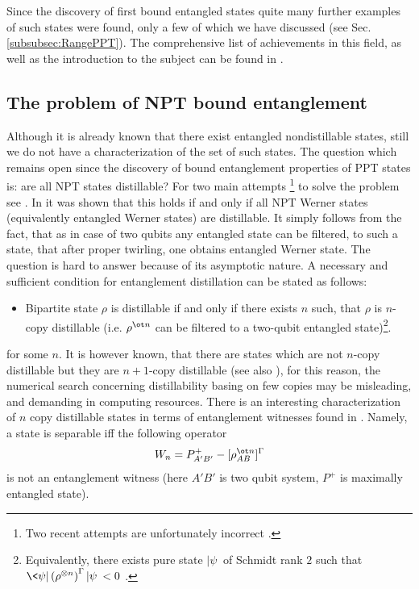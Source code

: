 \documentclass[rmp,12pt,preprint]{revtex4-2}
\begin{document}
Since the discovery of first bound entangled states quite many further
examples of such states were found, only a few of which we have
discussed (see Sec. \ref{subsubsec:RangePPT}). The comprehensive list
of achievements in this field, as well as the introduction to the
subject can be found in \cite{ClarissePhd}.

\subsection{The problem of NPT bound entanglement}

Although it is already known that there exist entangled nondistillable
states, still we do not have a characterization of the set of such
states. The question which remains open since the discovery of bound
entanglement properties of PPT states is: are all NPT states
distillable? For two main attempts \footnote{Two recent attempts are
  unfortunately incorrect \cite{ChattoSarkar,SimonNPTbound}.} to solve
the problem see
\cite{DiVincenzoSSTT1999-nptbound,DurCLB1999-npt-bound}. In
\cite{reduction} it was shown that this holds if and only if all NPT
Werner states (equivalently entangled Werner states) are
distillable. It simply follows from the fact, that as in case of two
qubits any entangled state can be filtered, to such a state, that
after proper twirling, one obtains entangled Werner state. The
question is hard to answer because of its asymptotic nature. A
necessary and sufficient condition for entanglement distillation
\cite{bound} can be stated as follows:
\begin{itemize}
\item Bipartite state $\rho$ is distillable if and only if there
  exists $n$ such, that $\rho$ is $n$-copy distillable
  (i.e. $\rho^{\ot n}$ can be filtered to a two-qubit entangled
  state)\footnote{Equivalently, there exists pure state $|\psi\>$ of
    Schmidt rank $2$ such that $\<\psi|\left(\rho^{\otimes
        n}\right)^\Gamma|\psi\><0$
    \cite{DiVincenzoSSTT1999-nptbound,DurCLB1999-npt-bound}.}.
\end{itemize}
for some $n$.  It is however known, that there are states which are
not $n$-copy distillable but they are $n+1$-copy distillable
\cite{Watrous2003-n-dist} (see also
\cite{Bandyopadhyay2003-n-distil}), for this reason, the numerical
search concerning distillability basing on few copies may be
misleading, and demanding in computing resources. There is an
interesting characterization of $n$ copy distillable states in terms
of entanglement witnesses found in \cite{KrausLC}. Namely, a state is
separable iff the following operator
\begin{equation}
W_n= P^+_{A'B'} - [\rho_{AB}^{\ot n}]^\Gamma
\end{equation}
is not an entanglement witness (here $A'B'$ is two qubit system, $P^+$
is maximally entangled state).
\end{document}
